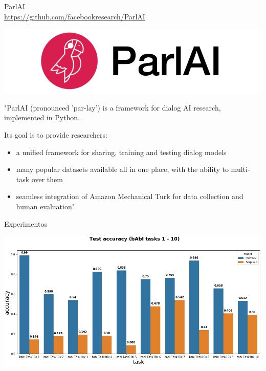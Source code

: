 \documentclass[10pt]{beamer}
\begin{document}
\begin{frame}{ParlAI \\ \url{https://github.com/facebookresearch/ParlAI}}

\begin{center}
\includegraphics[scale=0.84]{images/parlai.png}
\end{center}

"ParlAI (pronounced 'par-lay') is a framework for dialog AI research, implemented in Python.

Its goal is to provide researchers:

\begin{itemize}
\item a unified framework for sharing, training and testing dialog models
\item many popular datasets available all in one place, with the ability to multi-task over them
\item seamless integration of Amazon Mechanical Turk for data collection and human evaluation"
\end{itemize}

\end{frame}

\begin{frame}{Experimentos}
\begin{center}
\includegraphics[scale=0.34]{images/comparative_results_babi1.png}
\end{center}
\end{frame}
\end{document}
